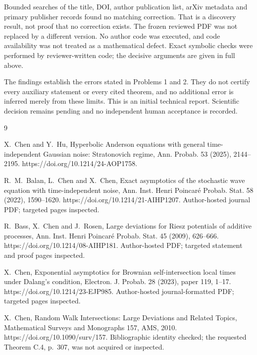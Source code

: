 \documentclass[10pt]{article}
\begin{document}
Bounded searches of the title, DOI, author publication list, arXiv metadata and primary publisher records found no matching correction. That is a discovery result, not proof that no correction exists. The frozen reviewed PDF was not replaced by a different version. No author code was executed, and code availability was not treated as a mathematical defect. Exact symbolic checks were performed by reviewer-written code; the decisive arguments are given in full above.\par
The findings establish the errors stated in Problems 1 and 2. They do not certify every auxiliary statement or every cited theorem, and no additional error is inferred merely from these limits. This is an initial technical report. Scientific decision remains pending and no independent human acceptance is recorded.\par
9\par
X. Chen and Y. Hu, Hyperbolic Anderson equations with general time-independent Gaussian noise: Stratonovich regime, Ann. Probab. 53 (2025), 2144–2195. https://doi.org/10.1214/24-AOP1758.\par
R. M. Balan, L. Chen and X. Chen, Exact asymptotics of the stochastic wave equation with time-independent noise, Ann. Inst. Henri Poincaré Probab. Stat. 58 (2022), 1590–1620. https://doi.org/10.1214/21-AIHP1207. Author-hosted journal PDF; targeted pages inspected.\par
R. Bass, X. Chen and J. Rosen, Large deviations for Riesz potentials of additive processes, Ann. Inst. Henri Poincaré Probab. Stat. 45 (2009), 626–666. https://doi.org/10.1214/08-AIHP181. Author-hosted PDF; targeted statement and proof pages inspected.\par
X. Chen, Exponential asymptotics for Brownian self-intersection local times under Dalang’s condition, Electron. J. Probab. 28 (2023), paper 119, 1–17. https://doi.org/10.1214/23-EJP985. Author-hosted journal-formatted PDF; targeted pages inspected.\par
X. Chen, Random Walk Intersections: Large Deviations and Related Topics, Mathematical Surveys and Monographs 157, AMS, 2010. https://doi.org/10.1090/surv/157. Bibliographic identity checked; the requested Theorem C.4, p. 307, was not acquired or inspected.\par
\end{document}
